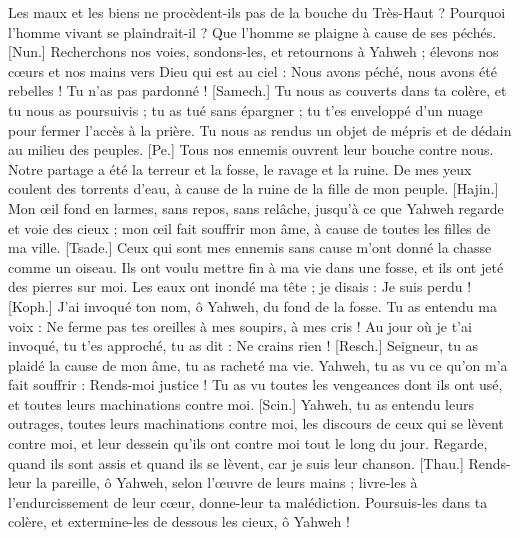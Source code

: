 \begin{multicols}{2}
Les maux et les biens ne procèdent-ils pas de la bouche du Très-Haut ?
Pourquoi l’homme vivant se plaindrait-il ? Que l’homme se plaigne à cause de ses péchés.
[Nun.] Recherchons nos voies, sondons-les, et retournons à Yahweh ;
élevons nos cœurs et nos mains vers Dieu qui est au ciel :
Nous avons péché, nous avons été rebelles ! Tu n’as pas pardonné !
[Samech.] Tu nous as couverts dans ta colère, et tu nous as poursuivis ; tu as tué sans épargner ;
tu t’es enveloppé d'un nuage pour fermer l’accès à la prière.
Tu nous as rendus un objet de mépris et de dédain au milieu des peuples.
[Pe.] Tous nos ennemis ouvrent leur bouche contre nous.
Notre partage a été la terreur et la fosse, le ravage et la ruine.
De mes yeux coulent des torrents d’eau, à cause de la ruine de la fille de mon peuple.
[Hajin.] Mon œil fond en larmes, sans repos, sans relâche,
jusqu’à ce que Yahweh regarde et voie des cieux ;
mon œil fait souffrir mon âme, à cause de toutes les filles de ma ville.
[Tsade.] Ceux qui sont mes ennemis sans cause m’ont donné la chasse comme un oiseau.
Ils ont voulu mettre fin à ma vie dans une fosse, et ils ont jeté des pierres sur moi.
Les eaux ont inondé ma tête ; je disais : Je suis perdu !
[Koph.] J’ai invoqué ton nom, ô Yahweh, du fond de la fosse.
Tu as entendu ma voix : Ne ferme pas tes oreilles à mes soupirs, à mes cris !
Au jour où je t’ai invoqué, tu t'es approché, tu as dit : Ne crains rien !
[Resch.] Seigneur, tu as plaidé la cause de mon âme, tu as racheté ma vie.
Yahweh, tu as vu ce qu’on m'a fait souffrir : Rends-moi justice !
Tu as vu toutes les vengeances dont ils ont usé, et toutes leurs machinations contre moi.
[Scin.] Yahweh, tu as entendu leurs outrages, toutes leurs machinations contre moi,
les discours de ceux qui se lèvent contre moi, et leur dessein qu'ils  ont contre moi tout le long du jour.
Regarde, quand ils sont assis et quand ils se lèvent, car je suis leur chanson.
[Thau.] Rends-leur la pareille, ô Yahweh, selon l’œuvre de leurs mains ;
livre-les à l'endurcissement de leur cœur, donne-leur ta malédiction.
Poursuis-les dans ta colère, et extermine-les de dessous les cieux, ô Yahweh !

\end{multicols}

